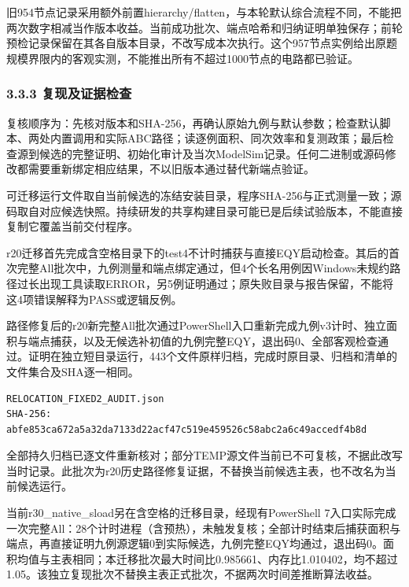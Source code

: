 \documentclass[UTF8,fontset=fandol,12pt]{ctexart}
\begin{document}
旧954节点记录采用额外前置hierarchy/\allowbreak{}flatten，与本轮默认综合流程不同，不能把两次数字相减当作版本收益。当前成功批次、端点哈希和归纳证明单独保存；前轮预检记录保留在其各自版本目录，不改写成本次执行。这个957节点实例给出原题规模界限内的客观实测，不能推出所有不超过1000节点的电路都已验证。

\Needspace{129.6pt}\subsubsection*{3.3.3  复现及证据检查}
复核顺序为：先核对版本和SHA-256，再确认原始九例与默认参数；检查默认脚本、两处内置调用和实际ABC路径；读逐例面积、同次效率和复测政策；最后检查源到候选的完整证明、初始化审计及当次ModelSim记录。任何二进制或源码修改都需要重新绑定相应结果，不以旧版本通过替代新端点验证。

可迁移运行文件取自当前候选的冻结安装目录，程序SHA-256与正式测量一致；源码取自对应候选快照。持续研发的共享构建目录可能已是后续试验版本，不能直接复制它覆盖当前交付程序。

r20迁移首先完成含空格目录下的test4不计时捕获与直接EQY启动检查。其后的首次完整All批次中，九例测量和端点绑定通过，但4个长名用例因Windows未规约路径过长出现工具读取ERROR，另5例证明通过；原失败目录与报告保留，不能将这4项错误解释为PASS或逻辑反例。

路径修复后的r20新完整All批次通过PowerShell入口重新完成九例v3计时、独立面积与端点捕获，以及无候选补初值的九例完整EQY，退出码0、全部客观检查通过。证明在独立短目录运行，443个文件原样归档，完成时原目录、归档和清单的文件集合及SHA逐一相同。

{\small
\noindent\begin{minipage}{\linewidth}
\begin{verbatim}
RELOCATION_FIXED2_AUDIT.json
SHA-256:
abfe853ca672a5a32da7133d22acf47c519e459526c58abc2a6c49accedf4b8d
\end{verbatim}
\end{minipage}
\par}
全部持久归档已逐文件重新核对；部分TEMP源文件当前已不可复核，不据此改写当时记录。此批次为r20历史路径修复证据，不替换当前候选主表，也不改名为当前候选运行。

当前r30\_\allowbreak{}native\_\allowbreak{}sload另在含空格的迁移目录，经现有PowerShell 7入口实际完成一次完整All：28个计时进程（含预热），未触发复核；全部计时结束后捕获面积与端点，再直接证明九例源逻辑0到实际候选，九例完整EQY均通过，退出码0。面积均值与主表相同；本迁移批次最大时间比0.985661、内存比1.010402，均不超过1.05。该独立复现批次不替换主表正式批次，不据两次时间差推断算法收益。
\end{document}
